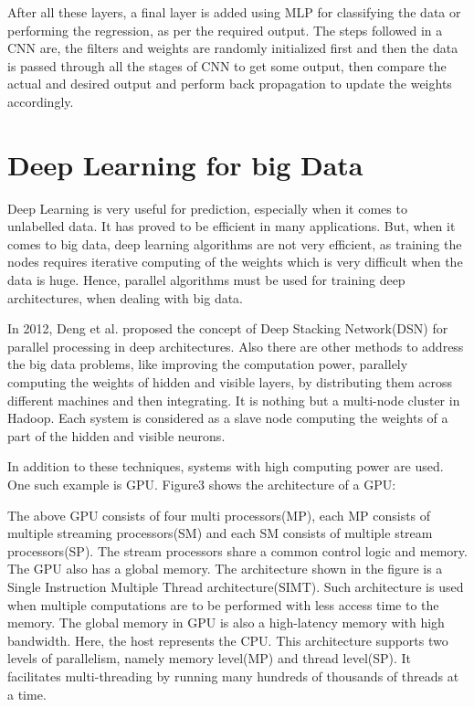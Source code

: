 \documentclass[sigconf]{acmart}
\begin{document}
After all these layers, a final layer is added using MLP for classifying the data or performing the regression, as per the required output. The steps followed in a CNN are, the filters and weights are randomly initialized first and then the data is passed through all the stages of CNN to get some output, then compare the actual and desired output and perform back propagation to update the weights accordingly.
\section{Deep Learning for  big Data}
Deep Learning is very useful for prediction, especially when it comes to unlabelled data. It has proved to be efficient in many applications. But, when it comes to big data, deep learning algorithms are not very efficient, as training the nodes requires iterative computing of the weights which is very difficult when the data is huge. Hence, parallel algorithms must be used for training deep architectures, when dealing with big data.

In 2012, Deng et al.\cite{Deng2012} proposed the concept of Deep Stacking Network(DSN) for parallel processing in deep architectures. Also there are other methods to address the big data problems, like improving the computation power, parallely computing the weights of hidden and visible layers, by distributing them across different machines and then integrating. It is nothing but a multi-node cluster in Hadoop. Each system is considered as a slave node computing the weights of a part of the hidden and visible neurons.

In addition to these techniques, systems with high computing power are used. One such example is GPU. Figure3 shows the architecture of a GPU:

The above GPU consists of four multi processors(MP), each MP consists of multiple streaming processors(SM) and each SM consists of multiple stream processors(SP). The stream processors share a common control logic and memory. The GPU also has a global memory. The architecture shown in the figure is a Single Instruction Multiple Thread architecture(SIMT). Such architecture is used when multiple computations are to be performed with less access time to the memory. The global memory in GPU is also a high-latency memory with high bandwidth. Here, the host represents the CPU. This architecture supports two levels of parallelism, namely memory level(MP) and thread level(SP). It facilitates multi-threading by running many hundreds of thousands of threads at a time.
\end{document}
